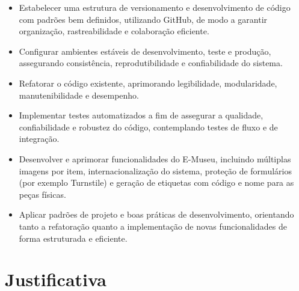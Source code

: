 \begin{itemize}
    \item Estabelecer uma estrutura de versionamento e desenvolvimento de código com padrões bem definidos, utilizando GitHub, de modo a garantir organização, rastreabilidade e colaboração eficiente.
    \item Configurar ambientes estáveis de desenvolvimento, teste e produção, assegurando consistência, reprodutibilidade e confiabilidade do sistema.
    \item Refatorar o código existente, aprimorando legibilidade, modularidade, manutenibilidade e desempenho. %
    \item Implementar testes automatizados a fim de assegurar a qualidade, confiabilidade e robustez do código, contemplando testes de fluxo e de integração.
    \item Desenvolver e aprimorar funcionalidades do E-Museu, incluindo múltiplas imagens por item, internacionalização do sistema, proteção de formulários (por exemplo Turnstile) e geração de etiquetas com código e nome para as peças físicas.
    \item Aplicar padrões de projeto e boas práticas de desenvolvimento, orientando tanto a refatoração quanto a implementação de novas funcionalidades de forma estruturada e eficiente.
\end{itemize}

\section{Justificativa}\label{sec:justificativa}



